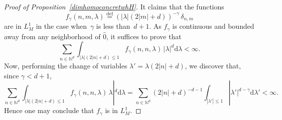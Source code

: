 \documentclass[11pt]{article}
\theoremstyle{definition}
\numberwithin{equation}{section}
\numberwithin{figure}{section}
\numberwithin{table}{section}
\newcommand{\lam}{\lambda}
\newcommand{\wh}{\widehat}
\newcommand*\N{\mathbb{N}}
\newcommand*\eqdefa{\overset{\mathrm{def}}{=}}
\newcommand*{\dd}{\mathrm{d}}
\newcommand{\dlam}{\dd \lambda}
\begin{document}
\begin{proof}[Proof of Proposition~\ref{dimhomoconcretwhH}] It claims that the functions
\[
f_\gamma (n,m,\lam) \eqdefa \left(|\lam| (2|m|+d)\right) ^{-\gamma} \, \delta_{n,m}
\]
are in $L^1_M$ in the case when~$\gamma$ is less than~$d+1$. As $f_\gamma$ is continuous and bounded away from any neighborhood of $\wh 0$, it suffices to prove that
\[
\sum_{n\in \N^d} \int_{|\lam| (2|n|+d)\leq 1} f_\gamma(n,n,\lam)\, |\lam|^d \dlam <\infty.
\]
Now, performing the change of variables $ \lam' = \lam (2|n|+d)$, we discover that, since $\gamma<d+1$,
\[
\sum_{n\in \N^d} \int_{|\lam| (2|n|+d)\leq 1} f_\gamma(n,n,\lam)\,\lam|^d \dlam = \sum_{n\in \N^d} (2|n|+d)^{-d-1} \int_{|\lam'|\leq 1} |\lam'| ^{d-\gamma} \dlam'<\infty.
\]
Hence one may conclude that $f_\gamma$ is in $L^1_M$.
\end{proof}
\end{document}
